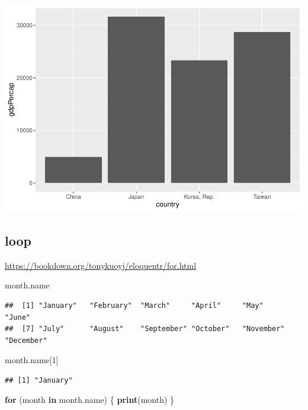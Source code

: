 \documentclass[
]{book}
\newenvironment{Shaded}{\begin{snugshade}}{\end{snugshade}}
\newcommand{\ControlFlowTok}[1]{\textcolor[rgb]{0.13,0.29,0.53}{\textbf{#1}}}
\newcommand{\DecValTok}[1]{\textcolor[rgb]{0.00,0.00,0.81}{#1}}
\newcommand{\FunctionTok}[1]{\textcolor[rgb]{0.13,0.29,0.53}{\textbf{#1}}}
\newcommand{\NormalTok}[1]{#1}
\theoremstyle{definition}
\theoremstyle{definition}
\theoremstyle{definition}
\theoremstyle{definition}
\theoremstyle{remark}
\begin{document}
\includegraphics{202402211401-R_files/figure-latex/unnamed-chunk-23-1.pdf}

\hypertarget{loop}{%
\subsection{loop}\label{loop}}

\url{https://bookdown.org/tonykuoyj/eloquentr/for.html}

\begin{Shaded}
\begin{Highlighting}[]
\NormalTok{month.name}
\end{Highlighting}
\end{Shaded}

\begin{verbatim}
##  [1] "January"   "February"  "March"     "April"     "May"       "June"     
##  [7] "July"      "August"    "September" "October"   "November"  "December"
\end{verbatim}

\begin{Shaded}
\begin{Highlighting}[]
\NormalTok{month.name[}\DecValTok{1}\NormalTok{]}
\end{Highlighting}
\end{Shaded}

\begin{verbatim}
## [1] "January"
\end{verbatim}

\begin{Shaded}
\begin{Highlighting}[]
\ControlFlowTok{for}\NormalTok{ (month }\ControlFlowTok{in}\NormalTok{ month.name) \{}
  \FunctionTok{print}\NormalTok{(month)}
\NormalTok{\}}
\end{Highlighting}
\end{Shaded}
\end{document}
